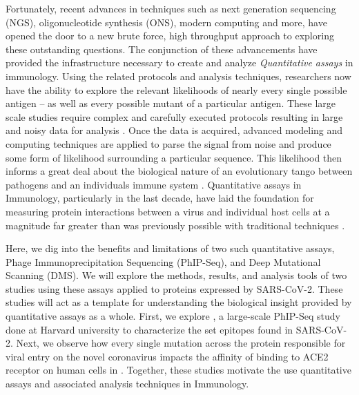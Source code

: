 \documentclass{article}
\begin{document}
Fortunately, recent advances in techniques such as next generation sequencing (NGS), oligonucleotide synthesis (ONS), modern computing and more, have opened the door to a new brute force, high throughput approach to exploring these outstanding questions.
The conjunction of these advancements have provided the infrastructure necessary to create and analyze \textit{Quantitative assays} in immunology.
Using the related protocols and analysis techniques, researchers now have the ability to explore the relevant likelihoods of nearly every single possible antigen -- as well as every possible mutant of a particular antigen.
These large scale studies require complex and carefully executed protocols resulting in large and noisy data for analysis \citep{Mohan2018, Bloom2014, Shrock2020}.
Once the data is acquired, advanced modeling and computing techniques are applied to parse the signal from noise and produce some form of likelihood surrounding a particular sequence.
This likelihood then informs a great deal about the biological nature of an evolutionary tango between pathogens and an individuals immune system \citep{Garrett2020}.
Quantitative assays in Immunology, particularly in the last decade, have laid the foundation for measuring protein interactions between a virus and individual host cells at a magnitude far greater than was previously possible with traditional techniques \citep{Fowler2014, Bloom2014}.


Here, we dig into the benefits and limitations of two such quantitative assays, Phage Immunoprecipitation Sequencing (PhIP-Seq), and Deep Mutational Scanning (DMS).
We will explore the methods, results, and analysis tools of two studies using these assays applied to proteins expressed by SARS-CoV-2.
These studies will act as a template for understanding the biological insight provided by quantitative assays as a whole.
First, we explore \citet{Shrock2020}, a large-scale PhIP-Seq study done at Harvard university to characterize the set epitopes found in SARS-CoV-2.
Next, we observe how every single mutation across the protein responsible for viral entry on the novel coronavirus impacts the affinity of binding to ACE2 receptor on human cells in \cite{Starr2020}.
Together, these studies motivate the use quantitative assays and associated analysis techniques in Immunology.
\end{document}
